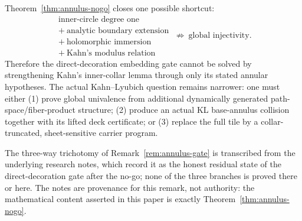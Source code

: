 \begin{remark}\label{rem:annulus-gate}
Theorem~\ref{thm:annulus-nogo} closes one possible shortcut:
\[ \boxed{\ \begin{array}{c}\text{inner-circle degree one}\\ +\ \text{analytic boundary extension}\\ +\ \text{holomorphic immersion}\\ +\ \text{Kahn's modulus relation}\end{array}\ \not\Longrightarrow\ \text{global injectivity}.\ } \]
Therefore the direct-decoration embedding gate cannot be solved by strengthening Kahn's inner-collar lemma through only its stated annular hypotheses. The actual Kahn--Lyubich question remains narrower: one must either (1) prove global univalence from additional dynamically generated path-space/fiber-product structure; (2) produce an actual KL base-annulus collision together with its lifted deck certificate; or (3) replace the full tile by a collar-truncated, sheet-sensitive carrier program.
\end{remark}

\begin{remark}\label{rem:annulus-gate-status}
The three-way trichotomy of Remark~\ref{rem:annulus-gate} is transcribed
from the underlying research notes, which record it as the honest
residual state of the direct-decoration gate after the no-go; none of
the three branches is proved there or here.  The notes are provenance
for this remark, not authority: the mathematical content asserted in
this paper is exactly Theorem~\ref{thm:annulus-nogo}.
\end{remark}